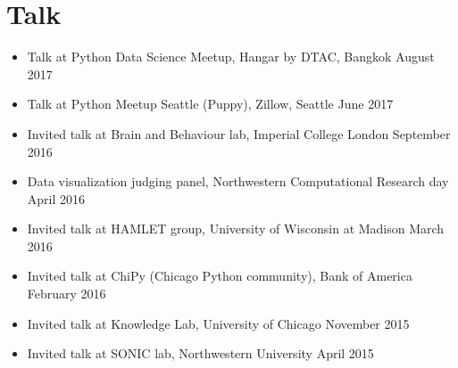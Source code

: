 \section{\sc Talk}

\begin{itemize}[leftmargin=0cm, label={}]

\item Talk at Python Data Science  Meetup, Hangar by DTAC, Bangkok \hfill August 2017
\item Talk at Python Meetup Seattle (Puppy), Zillow, Seattle \hfill June 2017
\item Invited talk at Brain and Behaviour lab, Imperial College London \hfill September 2016
\item Data visualization judging panel, Northwestern Computational Research day \hfill April 2016
\item Invited talk at HAMLET group, University of Wisconsin at Madison \hfill March 2016
\item Invited talk at ChiPy (Chicago Python community), Bank of America \hfill February 2016
\item Invited talk at Knowledge Lab, University of Chicago \hfill November 2015
\item Invited talk at SONIC lab, Northwestern University   \hfill April 2015

\end{itemize}
